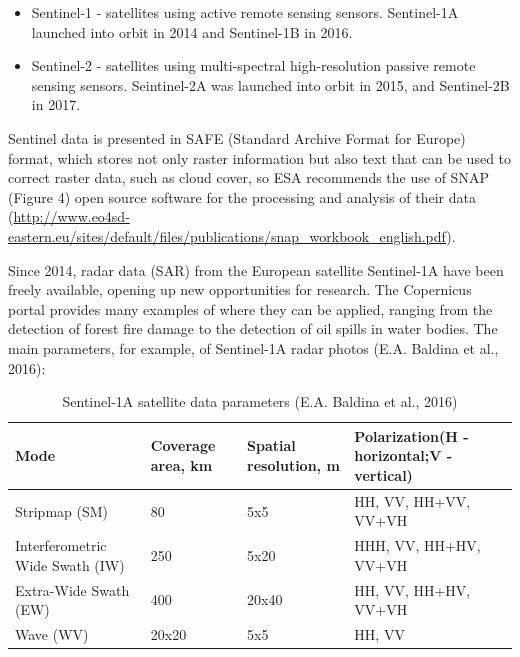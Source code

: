 {	\begin{itemize}
		\item Sentinel-1 - satellites using active remote sensing sensors. Sentinel-1A launched into orbit in 2014 and Sentinel-1B in 2016.
		\item Sentinel-2 - satellites using multi-spectral high-resolution passive remote sensing sensors. Seintinel-2A was launched into orbit in 2015, and Sentinel-2B in 2017.
	\end{itemize}

	Sentinel data is presented in SAFE (Standard Archive Format for Europe) format, which stores not only raster information but also text that can be used to correct raster data, such as cloud cover, so ESA recommends the use of SNAP (Figure 4) open source software for the processing and analysis of their data (\url{http://www.eo4sd-eastern.eu/sites/default/files/publications/snap_workbook_english.pdf}).
	
	Since 2014, radar data (SAR) from the European satellite Sentinel-1A have been freely available, opening up new opportunities for research. The Copernicus portal provides many examples of where they can be applied, ranging from the detection of forest fire damage to the detection of oil spills in water bodies. The main parameters, for example, of Sentinel-1A radar photos (E.A. Baldina et al., 2016):
	
	{\setlength{\extrarowheight}{15pt}%
	\begin{table}[H]
		\begin{center}
			\caption{Sentinel-1A satellite data parameters (E.A. Baldina et al., 2016)}
			\label{tab:sent-char}
			\begin{tabularx}{\textwidth}{|X|X|X|X|}
				\hline
				\textbf{Mode} & \textbf{Coverage area, km} & \textbf{Spatial resolution, m} & \textbf{Polarization\newline(H - horizontal;\newline V - vertical)}\\
				\hline
				Stripmap (SM) & 80 & 5x5 & HH, VV, HH+VV, VV+VH \\
				\hline
				Interferometric Wide Swath (IW) & 250 & 5x20 & HHH, VV, HH+HV, VV+VH \\
				\hline
				Extra-Wide Swath (EW) & 400 & 20x40 & HH, VV, HH+HV, VV+VH \\
				\hline
				Wave (WV) & 20x20 & 5x5 & HH, VV \\
				\hline
			\end{tabularx}
		\end{center}
	\end{table}

}}

